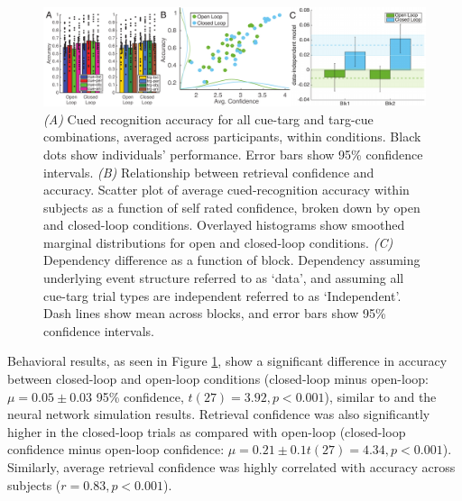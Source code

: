 \documentclass[11pt, titlepage, twoside]{article}
\begin{document}
\begin{figure}
	\begin{center}
		\includegraphics[width=\textwidth]{figs/deevEEGBeh.pdf}
	\end{center}
	\caption[EEG Dependent Events Behavior]{
		\emph{(A)} Cued recognition accuracy for all cue-targ and targ-cue combinations, averaged across participants, within conditions. Black dots show individuals' performance.  Error bars show 95\% confidence intervals. 
		\emph{(B)} Relationship between retrieval confidence and accuracy.  Scatter plot of average cued-recognition accuracy within subjects as a function of self rated confidence, broken down by open and closed-loop conditions.  Overlayed histograms show smoothed marginal distributions for open and closed-loop conditions.
		\emph{(C)} Dependency difference as a function of block. Dependency assuming underlying event structure referred to as `data', and assuming all cue-targ trial types are independent referred to as `Independent'.  Dash lines show mean across blocks, and error bars show 95\% confidence intervals.
	}
	\label{fig:deevEEGBeh}
\end{figure}


Behavioral results, as seen in Figure \ref{fig:deevEEGBeh}, show a significant difference in accuracy between closed-loop and open-loop conditions (closed-loop minus open-loop: $\mu=0.05\pm0.03$ 95\% confidence, $t(27)=3.92, p<0.001$), similar to \textcite{HornerBisbyBushEtAl15} and the neural network simulation results.  Retrieval confidence was also significantly higher in the closed-loop trials as compared with open-loop (closed-loop confidence minus open-loop confidence: $\mu=0.21\pm0.1 t(27)=4.34, p<0.001$).  Similarly, average retrieval confidence was highly correlated with accuracy across subjects ($r=0.83,p<0.001$).
\end{document}
